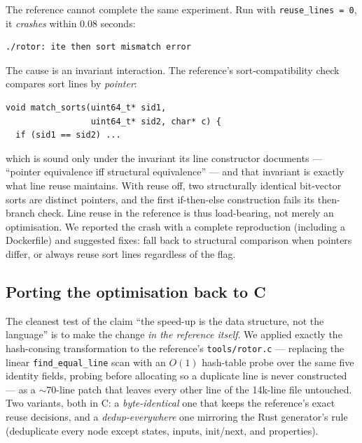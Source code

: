 \documentclass[sigplan,screen,nonacm]{acmart}
\begin{document}
The reference cannot complete the same experiment. Run with
\texttt{reuse\_lines = 0}, it \emph{crashes} within 0.08 seconds:

\begin{lstlisting}
./rotor: ite then sort mismatch error
\end{lstlisting}

\noindent The cause is an invariant interaction. The reference's
sort-compatibility check compares sort lines by \emph{pointer}:

\begin{lstlisting}
void match_sorts(uint64_t* sid1,
                 uint64_t* sid2, char* c) {
  if (sid1 == sid2) ...
\end{lstlisting}

\noindent which is sound only under the invariant its line constructor
documents --- ``pointer equivalence iff structural equivalence'' ---
and that invariant is exactly what line reuse maintains. With reuse
off, two structurally identical bit-vector sorts are distinct pointers,
and the first if-then-else construction fails its then-branch check.
Line reuse in the reference is thus load-bearing, not merely an
optimisation. We reported the crash with a complete reproduction
(including a Dockerfile) and suggested fixes: fall back to structural
comparison when pointers differ, or always reuse sort lines regardless
of the flag.

\subsection{Porting the optimisation back to C}
\label{sec:backport}

The cleanest test of the claim ``the speed-up is the data structure, not
the language'' is to make the change \emph{in the reference itself}. We
applied exactly the hash-consing transformation to the reference's
\texttt{tools/rotor.c} --- replacing the linear \texttt{find\_equal\_line}
scan with an $O(1)$ hash-table probe over the same five identity fields,
probing before allocating so a duplicate line is never constructed --- as a
$\sim$70-line patch that leaves every other line of the 14k-line file
untouched. Two variants, both in C: a \emph{byte-identical} one that keeps
the reference's exact reuse decisions, and a \emph{dedup-everywhere} one
mirroring the Rust generator's rule (deduplicate every node except
states, inputs, init/next, and properties).
\end{document}
